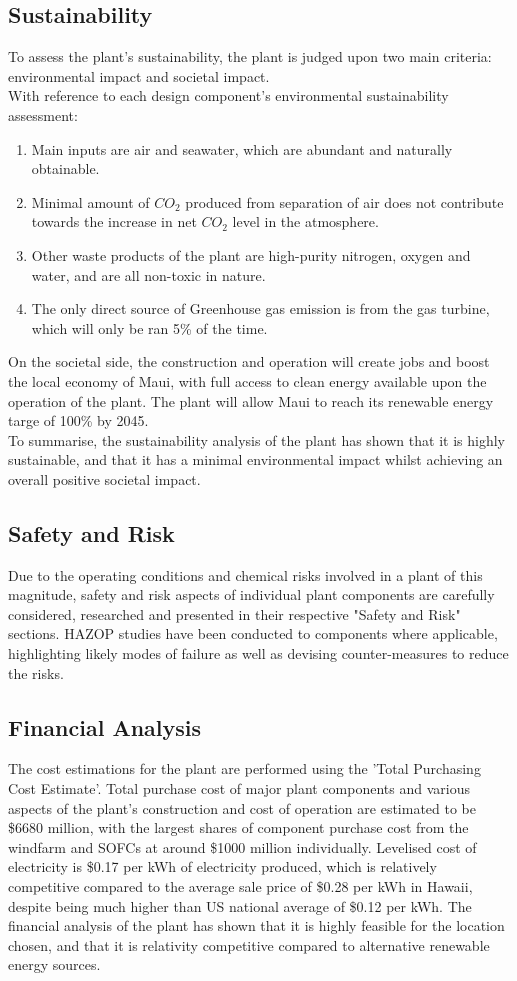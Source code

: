 \subsection{Sustainability}
To assess the plant's sustainability, the plant is judged upon two main criteria: environmental impact and societal impact. \\
With reference to each design component's environmental sustainability assessment: \\
\begin{enumerate}
    \item Main inputs are air and seawater, which are abundant and naturally obtainable.
    \item Minimal amount of $CO_2$ produced from separation of air does not contribute towards the increase in net $CO_2$ level in the atmosphere.
    \item Other waste products of the plant are high-purity nitrogen, oxygen and water, and are all non-toxic in nature.
    \item The only direct source of Greenhouse gas emission is from the gas turbine, which will only be ran 5\% of the time.
\end{enumerate}
On the societal side, the construction and operation will create jobs and boost the local economy of Maui, with full access to clean energy available upon the operation of the plant. The plant will allow Maui to reach its renewable energy targe of 100\% by 2045.\\
To summarise, the sustainability analysis of the plant has shown that it is highly sustainable, and that it has a minimal environmental impact whilst achieving an overall positive societal impact.
\subsection{Safety and Risk}
Due to the operating conditions and chemical risks involved in a plant of this magnitude, safety and risk aspects of individual plant components are carefully considered, researched and presented in their respective "Safety and Risk" sections. HAZOP studies have been conducted to components where applicable, highlighting likely modes of failure as well as devising counter-measures to reduce the risks.
\subsection{Financial Analysis}
The cost estimations for the plant are performed using the 'Total Purchasing Cost Estimate'. Total purchase cost of major plant components and various aspects of the plant's construction and cost of operation are estimated to be \$6680 million, with the largest shares of component purchase cost from the windfarm and SOFCs at around \$1000 million individually. Levelised cost of electricity is \$0.17 per kWh of electricity produced, which is relatively competitive compared to the average sale price of \$0.28 per kWh in Hawaii, despite being much higher than US national average of \$0.12 per kWh. The financial analysis of the plant has shown that it is highly feasible for the location chosen, and that it is relativity competitive compared to alternative renewable energy sources.
